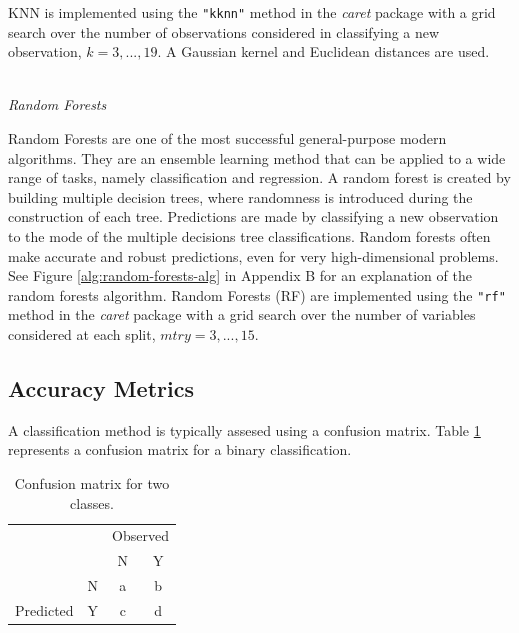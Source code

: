 \documentclass[12pt,]{article}
\begin{document}
KNN is implemented using the \texttt{"kknn"} method in the \emph{caret}
package with a grid search over the number of observations considered in
classifying a new observation, \(k=3,...,19\). A Gaussian kernel and
Euclidean distances are used.

\(~\)\\
\emph{Random Forests}

Random Forests \autocite{breiman_random_2001} are one of the most
successful general-purpose modern algorithms\autocite{biau_random_2016}.
They are an ensemble learning method that can be applied to a wide range
of tasks, namely classification and regression. A random forest is
created by building multiple decision trees, where randomness is
introduced during the construction of each tree. Predictions are made by
classifying a new observation to the mode of the multiple decisions tree
classifications. Random forests often make accurate and robust
predictions, even for very high-dimensional
problems\autocite{biau_analysis_2012}. See Figure
\ref{alg:random-forests-alg} in Appendix B for an explanation of the
random forests algorithm. Random Forests (RF) are implemented using the
\texttt{"rf"} method in the \emph{caret} package with a grid search over
the number of variables considered at each split, \(mtry=3,...,15\).

\subsection{Accuracy Metrics}\label{accuracy-metrics}

A classification method is typically assesed using a confusion matrix.
Table \ref{tab:confusion-matrix} represents a confusion matrix for a
binary classification.

\begin{table}[!h]

\caption{\label{tab:unnamed-chunk-1}\label{tab:confusion-matrix} Confusion matrix for two classes.}
\centering
\fontsize{12}{14}\selectfont
\begin{tabular}{lc|cc}
\toprule
\multicolumn{2}{c}{ } & \multicolumn{2}{c}{Observed} \\
\cmidrule(l{3pt}r{3pt}){3-4}
  &   & N & Y\\
\midrule
\rowcolor{gray!6}   & N & a & b\\

\multirow{-2}{*}{\raggedright\arraybackslash Predicted} & Y & c & d\\
\bottomrule
\end{tabular}
\end{table}
\end{document}
